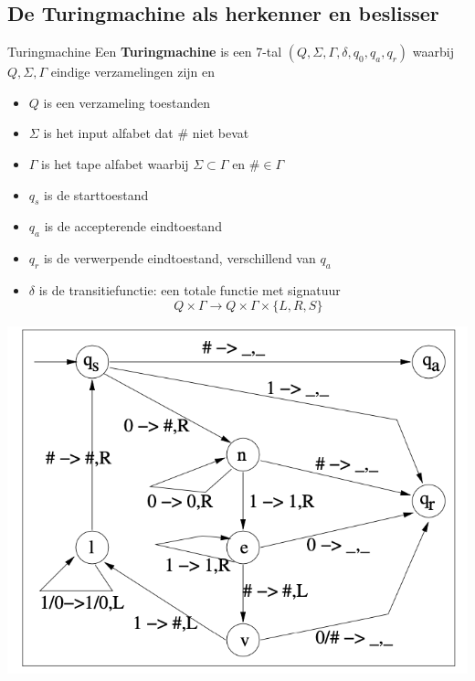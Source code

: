 \subsection{De Turingmachine als herkenner en beslisser}

\vspace{0.5cm}

\begin{theo}[Turingmachine]{Turingmachine}
    Een \textbf{Turingmachine} is een 7-tal $(Q, \Sigma, \Gamma, \delta, q_0, q_{a}, q_{r})$ waarbij $Q, \Sigma, \Gamma$ eindige verzamelingen zijn en 
    
    \vspace{0.3cm}\begin{minipage}{0.56\textwidth}
        \begin{itemize}
            \item $Q$ is een verzameling toestanden
            \item $\Sigma$ is het input alfabet dat $\#$ niet bevat
            \item $\Gamma$ is het tape alfabet waarbij $\Sigma \subset \Gamma$ en $\# \in \Gamma$
            \item $q_s$ is de starttoestand
            \item $q_a$ is de accepterende eindtoestand
            \item $q_r$ is de verwerpende eindtoestand, verschillend van $q_a$
            \item $\delta$ is de transitiefunctie: een totale functie met signatuur
            \begin{equation*}
                Q \times \Gamma \rightarrow Q \times \Gamma \times \{L, R, S\}
            \end{equation*}
        \end{itemize}
    \end{minipage}
    \hspace{0.2cm}\begin{minipage}{0.4\textwidth}
        \includegraphics[scale = 0.27]{Images/TuringmachineEx.png}
    \end{minipage}
\end{theo}


